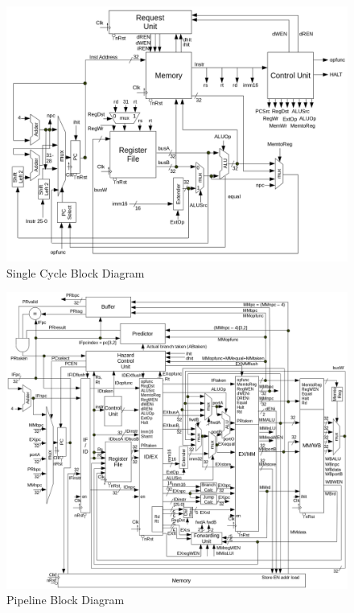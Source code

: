 \documentclass[12pt]{article}
\begin{document}
  \begin{figure}[hp]
    \begin{center}
      \includegraphics[width=\textwidth]{diagram_singlecycle.png}
    \end{center}

    \caption{Single Cycle Block Diagram}
		\label{fig:singlecycle}
  \end{figure}

  \newpage
  \begin{figure}[hp]
    \begin{center}
      \includegraphics[width=\textwidth]{diagram_pipeline.png}
    \end{center}

    \caption{Pipeline Block Diagram}
		\label{fig:pipeline}
  \end{figure}
\end{document}
